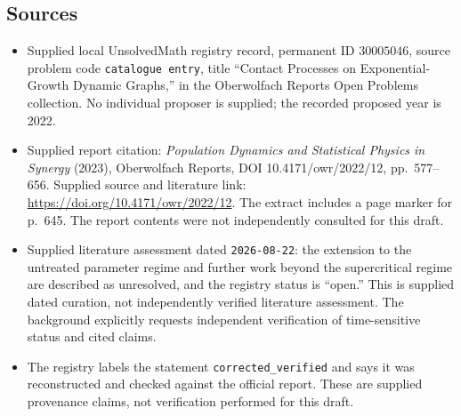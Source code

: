 \documentclass[11pt]{article}
\begin{document}
\subsection{Sources}
\begin{itemize}
\item Supplied local UnsolvedMath registry record, permanent ID \(30005046\), source problem code \texttt{catalogue entry}, title ``Contact Processes on Exponential-Growth Dynamic Graphs,'' in the Oberwolfach Reports Open Problems collection. No individual proposer is supplied; the recorded proposed year is 2022.
\item Supplied report citation: \emph{Population Dynamics and Statistical Physics in Synergy} (2023), Oberwolfach Reports, DOI 10.4171/owr/2022/12, pp.\ 577--656. Supplied source and literature link: \url{https://doi.org/10.4171/owr/2022/12}. The extract includes a page marker for p.\ 645. The report contents were not independently consulted for this draft.
\item Supplied literature assessment dated \texttt{2026-08-22}: the extension to the untreated parameter regime and further work beyond the supercritical regime are described as unresolved, and the registry status is ``open.'' This is supplied dated curation, not independently verified literature assessment. The background explicitly requests independent verification of time-sensitive status and cited claims.
\item The registry labels the statement \texttt{corrected\_verified} and says it was reconstructed and checked against the official report. These are supplied provenance claims, not verification performed for this draft.
\end{itemize}
\end{document}
